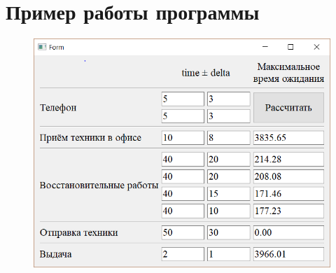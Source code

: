 \section{Пример работы программы}

\begin{figure}[h]
	\centering
	\includegraphics[width=\linewidth]{src/result}
	\caption{}
	\label{fig:result}
\end{figure}


